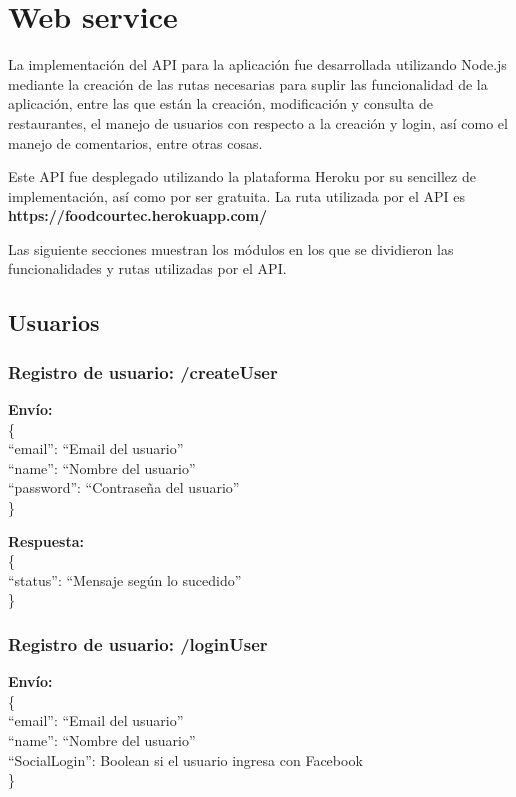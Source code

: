 \documentclass[12pt,letterpaper]{article}
\begin{document}
\section{Web service}

La implementación del API para la aplicación fue desarrollada utilizando Node.js mediante la creación de las rutas necesarias para suplir las funcionalidad de la aplicación, entre las que están la creación, modificación y consulta de restaurantes, el manejo de usuarios con respecto a la creación y login, así como el manejo de comentarios, entre otras cosas.

Este API fue desplegado utilizando la plataforma Heroku por su sencillez de implementación, así como por ser gratuita. La ruta utilizada por el API es \textbf{https://foodcourtec.herokuapp.com/}

Las siguiente secciones muestran los módulos en los que se dividieron las funcionalidades y rutas utilizadas por el API.

\subsection{Usuarios} 
\subsubsection{Registro de usuario: /createUser}
\noindent
\textbf{Envío: }\\
\noindent
\{ \\
``email'': ``Email del usuario'' \\
``name'': ``Nombre del usuario''\\
``password'': ``Contraseña del usuario''\\
\}

\noindent
\textbf{Respuesta: }\\
\noindent
\{ \\
``status'': ``Mensaje según lo sucedido'' \\
\}

\subsubsection{Registro de usuario: /loginUser}
\noindent
\textbf{Envío: }\\
\noindent
\{ \\
``email'': ``Email del usuario'' \\
``name'': ``Nombre del usuario''\\
``SocialLogin'': Boolean si el usuario ingresa con Facebook\\
\}
\end{document}
